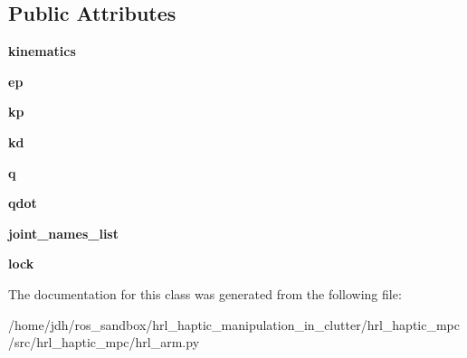 \subsection*{\-Public \-Attributes}
\begin{DoxyCompactItemize}
\item 
\hypertarget{classhrl__haptic__mpc_1_1hrl__arm_1_1_h_r_l_arm_af524622e9dce8fe2e29035ab4033a295}{{\bfseries kinematics}}\label{classhrl__haptic__mpc_1_1hrl__arm_1_1_h_r_l_arm_af524622e9dce8fe2e29035ab4033a295}

\item 
\hypertarget{classhrl__haptic__mpc_1_1hrl__arm_1_1_h_r_l_arm_ab487c644bfb8b47e9a8839a14d342d90}{{\bfseries ep}}\label{classhrl__haptic__mpc_1_1hrl__arm_1_1_h_r_l_arm_ab487c644bfb8b47e9a8839a14d342d90}

\item 
\hypertarget{classhrl__haptic__mpc_1_1hrl__arm_1_1_h_r_l_arm_ad392d8235c9a003d0211da3a4889b4d6}{{\bfseries kp}}\label{classhrl__haptic__mpc_1_1hrl__arm_1_1_h_r_l_arm_ad392d8235c9a003d0211da3a4889b4d6}

\item 
\hypertarget{classhrl__haptic__mpc_1_1hrl__arm_1_1_h_r_l_arm_a8a610c96e1627effe385b812fb13bc01}{{\bfseries kd}}\label{classhrl__haptic__mpc_1_1hrl__arm_1_1_h_r_l_arm_a8a610c96e1627effe385b812fb13bc01}

\item 
\hypertarget{classhrl__haptic__mpc_1_1hrl__arm_1_1_h_r_l_arm_a1bdc3294218beb401269773bc7d6f3f1}{{\bfseries q}}\label{classhrl__haptic__mpc_1_1hrl__arm_1_1_h_r_l_arm_a1bdc3294218beb401269773bc7d6f3f1}

\item 
\hypertarget{classhrl__haptic__mpc_1_1hrl__arm_1_1_h_r_l_arm_a3ddfc3f4f57a1167a1f49132ca73962a}{{\bfseries qdot}}\label{classhrl__haptic__mpc_1_1hrl__arm_1_1_h_r_l_arm_a3ddfc3f4f57a1167a1f49132ca73962a}

\item 
\hypertarget{classhrl__haptic__mpc_1_1hrl__arm_1_1_h_r_l_arm_a4546b353931881dc16525ab2567b0e99}{{\bfseries joint\-\_\-names\-\_\-list}}\label{classhrl__haptic__mpc_1_1hrl__arm_1_1_h_r_l_arm_a4546b353931881dc16525ab2567b0e99}

\item 
\hypertarget{classhrl__haptic__mpc_1_1hrl__arm_1_1_h_r_l_arm_a6928ab8330d8589abd2affbbf2b9415c}{{\bfseries lock}}\label{classhrl__haptic__mpc_1_1hrl__arm_1_1_h_r_l_arm_a6928ab8330d8589abd2affbbf2b9415c}

\end{DoxyCompactItemize}


\-The documentation for this class was generated from the following file\-:\begin{DoxyCompactItemize}
\item 
/home/jdh/ros\-\_\-sandbox/hrl\-\_\-haptic\-\_\-manipulation\-\_\-in\-\_\-clutter/hrl\-\_\-haptic\-\_\-mpc/src/hrl\-\_\-haptic\-\_\-mpc/hrl\-\_\-arm.\-py\end{DoxyCompactItemize}
